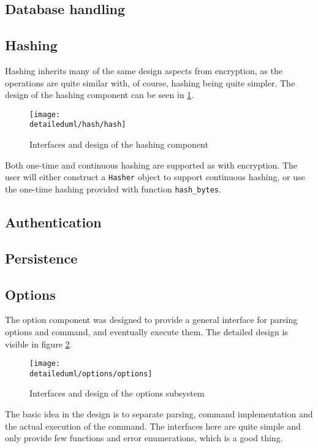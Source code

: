 \subsection{Database handling}
\subsection{Hashing}

Hashing inherits many of the same design aspects from encryption, as the
operations are quite similar with, of course, hashing being quite simpler.
The design of the hashing component can be seen in \ref{dia:hash_design}.

\begin{figure}[H]
    \centering
    \centerline{\texttt{[image: \\detaileduml/hash/hash]}}
    \caption{Interfaces and design of the hashing component}
    \label{dia:hash_design}
\end{figure}

Both one-time and continuous hashing are supported as with encryption. The user
will either construct a \texttt{Hasher} object to support continuous hashing, or
use the one-time hashing provided with function \texttt{hash\_bytes}.

\subsection{Authentication}
\subsection{Persistence}
\subsection{Options}

The option component was designed to provide a general interface for parsing
options and command, and eventually execute them. The detailed design is visible
in figure \ref{dia:options_design}.

\begin{figure}[H]
    \centering
    \centerline{\texttt{[image: \\detaileduml/options/options]}}
    \caption{Interfaces and design of the options subsystem}
    \label{dia:options_design}
\end{figure}

The basic idea in the design is to separate parsing, command implementation
and the actual execution of the command. The interfaces here are quite simple
and only provide few functions and error enumerations, which is a good thing.

